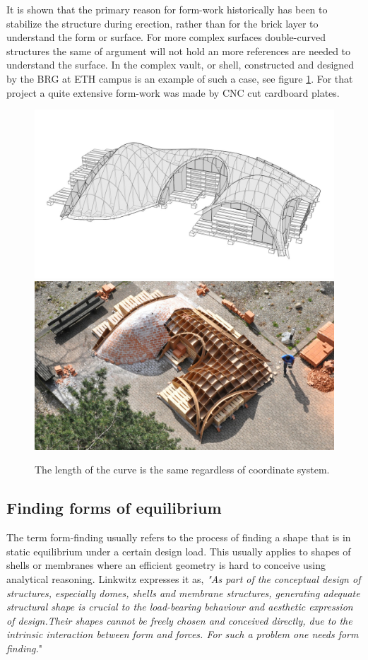 It is shown that the primary reason for form-work historically has been to stabilize the structure during erection, rather than for the brick layer to understand the form or surface. For more complex surfaces double-curved structures the same of argument will not hold an more references are needed to understand the surface. In the complex vault, or shell, constructed and designed by the BRG at ETH campus is an example of such a case, see figure \ref{fig:ethvault}. For that project a quite extensive form-work was made by CNC cut cardboard plates.\cite{ref:Davis}
 

\begin{figure}[H]
\centering
\includegraphics[width=0.49\linewidth ]{figure/Introduction/VaultBlock2.jpg}
\includegraphics[width=0.49\linewidth ]{figure/Introduction/VaultBlock.jpg}
\caption{The length of the curve is the same regardless of coordinate system.}
\label{fig:ethvault}
\end{figure}


\subsection{Finding forms of equilibrium} \label{sec:findingform}

The term form-finding usually refers to the process of finding a shape that is in static equilibrium under a certain design load. This usually applies to shapes of shells or membranes where an efficient geometry is hard to conceive using analytical reasoning. Linkwitz expresses it as,
\textit{"As part of the conceptual design of structures, especially domes, shells and membrane structures, generating adequate structural shape is crucial to the load-bearing behaviour and aesthetic  expression of design.Their shapes cannot be freely chosen and conceived directly, due to the intrinsic interaction between form and forces. For such a problem one needs \textit{form finding}.}" \cite{ref:ShellOpt}

